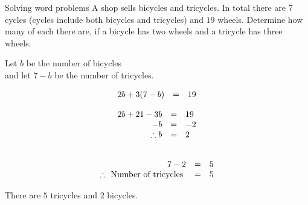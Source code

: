 \begin{wex}
{Solving word problems}
{
A shop sells bicycles and tricycles. In total there are $7$ cycles (cycles include both bicycles and tricycles) and $19$ wheels. Determine how many of each there are, if a bicycle has two wheels and a tricycle has three wheels.
}
{
Let $b$ be the number of bicycles \\
and let $7-b$ be the number of tricycles. 

\begin{equation*}
\begin{array}{ccc}\hfill 2b+3(7-b)& =& 19\hfill \end{array}
\end{equation*}


\begin{equation*}
\begin{array}{ccl}
 \hfill 2b + 21 - 3b& =& 19\hfill \\
\hfill - b& =& -2\hfill \\
 \hfill \therefore b& =& 2\hfill 
\end{array}
\end{equation*}

\begin{equation*}
\begin{array}{ccl}
\\ \hfill  7 - 2 & =& 5\hfill \\
 \therefore \mbox{ Number of tricycles }& =& 5
\end{array}
\end{equation*}

 There are $5$ tricycles and $2$ bicycles.

}       
\end{wex}

